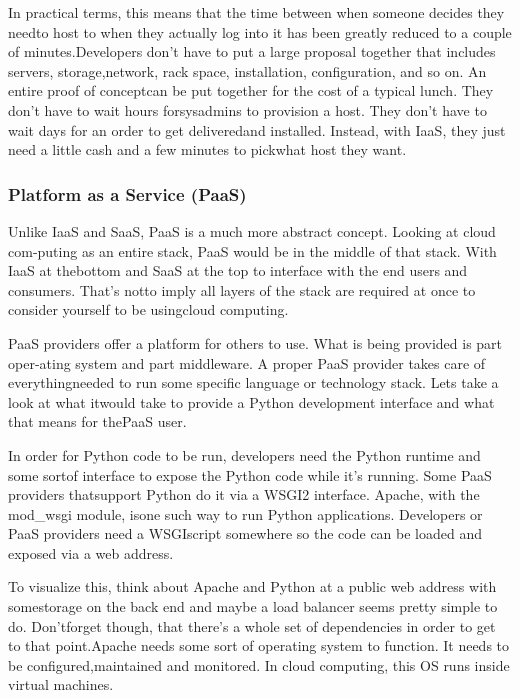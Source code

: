 In practical terms, this means that the time between when someone decides they needto host to when they actually log into it has been greatly reduced to a couple of minutes.Developers don’t have to put a large proposal together that includes servers, storage,network, rack space, installation, configuration, and so on. An entire proof of conceptcan be put together for the cost of a typical lunch. They don’t have to wait hours forsysadmins to provision a host. They don’t have to wait days for an order to get deliveredand installed. Instead, with IaaS, they just need a little cash and a few minutes to pickwhat host they want.

\subsubsection*{Platform as a Service (PaaS)}
Unlike IaaS and SaaS, PaaS is a much more abstract concept. Looking at cloud com-puting as an entire stack, PaaS would be in the middle of that stack. With IaaS at thebottom and SaaS at the top to interface with the end users and consumers. That’s notto imply all layers of the stack are required at once to consider yourself to be usingcloud computing.
\newline

PaaS providers offer a platform for others to use. What is being provided is part oper-ating system and part middleware. A proper PaaS provider takes care of everythingneeded to run some specific language or technology stack. Lets take a look at what itwould take to provide a Python development interface and what that means for thePaaS user.
\newline

In order for Python code to be run, developers need the Python runtime and some sortof interface to expose the Python code while it’s running. Some PaaS providers thatsupport Python do it via a WSGI2 interface. Apache, with the mod\_wsgi module, isone such way to run Python applications. Developers or PaaS providers need a WSGIscript somewhere so the code can be loaded and exposed via a web address.
\newline

To visualize this, think about Apache and Python at a public web address with somestorage on the back end and maybe a load balancer seems pretty simple to do. Don’tforget though, that there’s a whole set of dependencies in order to get to that point.Apache needs some sort of operating system to function. It needs to be configured,maintained and monitored. In cloud computing, this OS runs inside virtual machines.
\newline

